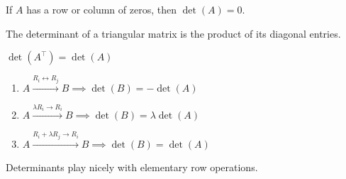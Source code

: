 \documentclass[12pt]{article}
\begin{document}
\newpage
\begin{thm}
  If $A$ has a row or column of zeros, then $\det(A)=0$.
\end{thm}

\begin{thm}
  The determinant of a triangular matrix is the product of its diagonal entries.
\end{thm}

\begin{thm}
  $\det(A^\top)=\det(A)$
\end{thm}

\begin{thm}\leavevmode
  \begin{enumerate}
  \item $A\xrightarrow{R_i\leftrightarrow R_j}B\implies\det(B)=-\det(A)$
  \item $A\xrightarrow{\lambda R_i\to R_i}B\implies\det(B)=\lambda\det(A)$
  \item $A\xrightarrow{R_i+\lambda R_j\to R_i}B\implies\det(B)=\det(A)$
  \end{enumerate}
\end{thm}

\begin{idea}
  Determinants play nicely with elementary row operations.
\end{idea}


{}

\end{document}
